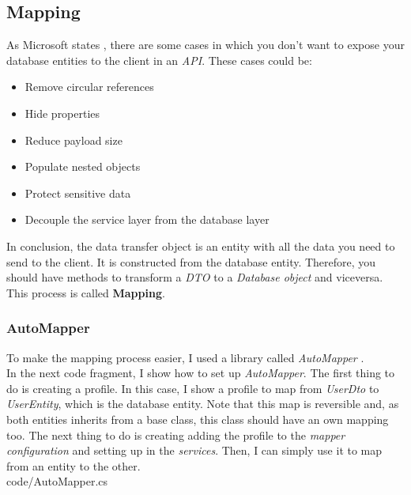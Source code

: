     \subsection{Mapping}
        As Microsoft states \cite{DTO}, there are some cases in which you don't want to expose your database entities to the client in an \textit{API}. These cases could be:
        \begin{itemize}[noitemsep]
            \item Remove circular references
            \item Hide properties 
            \item Reduce payload size
            \item Populate nested objects 
            \item Protect sensitive data
            \item Decouple the service layer from the database layer
        \end{itemize}

        In conclusion, the data transfer object is an entity with all the data you need to send to the client. It is constructed from the database entity. Therefore, you should have methods to transform a \textit{DTO} to a \textit{Database object} and viceversa. This process is called \textbf{Mapping}.

        \subsubsection{AutoMapper}
            To make the mapping process easier, I used a library called \textit{AutoMapper} \cite{AutoMapper}. \\

            In the next code fragment, I show how to set up \textit{AutoMapper}. The first thing to do is creating a profile. In this case, I show a profile to map from \textit{UserDto} to \textit{UserEntity}, which is the database entity. Note that this map is reversible and, as both entities inherits from a base class, this class should have an own mapping too. The next thing to do is creating adding the profile to the \textit{mapper configuration} and setting up in the \textit{services}. Then, I can simply use it to map from an entity to the other. \\
            
            {code/AutoMapper.cs}

